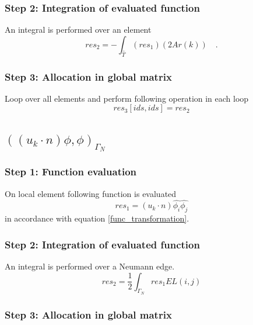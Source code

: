 \documentclass[a4paper,openany]{book}
\begin{document}
\subsubsection{Step 2: Integration of evaluated function}

An integral is performed over an element 
\begin{equation}
res_2= - \int_{\hat{T}} (res_1) (2Ar(k)) \quad \textrm{.}
\end{equation}

\subsubsection{Step 3: Allocation in global matrix}

Loop over all elements and perform following operation in each loop 
\begin{equation}
res_3[ids,ids]=res_2
\end{equation}

\subsection{$((u_k \cdot n)\phi , \phi)_{\Gamma_N}$} 

\subsubsection{Step 1: Function evaluation}

On local element following function is evaluated
\begin{equation}
res_1 = (u_k \cdot n) \hat{\phi_i} \hat{\phi_j}
\end{equation} 
in accordance with equation \eqref{func_transformation}.\\

\subsubsection{Step 2: Integration of evaluated function}

An integral is performed over a Neumann edge. 
\begin{equation}
res_2 = \frac{1}{2}  \int_{\Gamma_N} res_1 EL(i,j)
\end{equation}

\subsubsection{Step 3: Allocation in global matrix}
\end{document}
